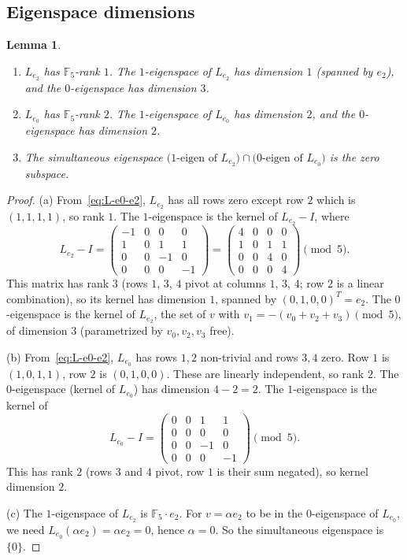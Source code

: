 \documentclass[11pt,reqno]{amsart}
\theoremstyle{plain}
\newtheorem{lemma}[theorem]{Lemma}
\theoremstyle{definition}
\theoremstyle{remark}
\newcommand{\F}{\mathbb{F}}
\begin{document}
\subsection{Eigenspace dimensions}

\begin{lemma} \label{lem:eigenspaces}
\begin{enumerate}[label=\textup{(\alph*)}]
\item $L_{e_2}$ has $\F_5$-rank $1$. The $1$-eigenspace of $L_{e_2}$ has dimension $1$ (spanned by $e_2$), and the $0$-eigenspace has dimension $3$.
\item $L_{e_0}$ has $\F_5$-rank $2$. The $1$-eigenspace of $L_{e_0}$ has dimension $2$, and the $0$-eigenspace has dimension $2$.
\item The simultaneous eigenspace $\bigl(\text{1-eigen of } L_{e_2}\bigr) \cap \bigl(\text{0-eigen of } L_{e_0}\bigr)$ is the zero subspace.
\end{enumerate}
\end{lemma}

\begin{proof}
(a) From~\eqref{eq:L-e0-e2}, $L_{e_2}$ has all rows zero except row $2$ which is $(1, 1, 1, 1)$, so rank $1$. The $1$-eigenspace is the kernel of $L_{e_2} - I$, where
\[
L_{e_2} - I = \begin{pmatrix}
-1 & 0 & 0 & 0 \\
1 & 0 & 1 & 1 \\
0 & 0 & -1 & 0 \\
0 & 0 & 0 & -1
\end{pmatrix} = \begin{pmatrix}
4 & 0 & 0 & 0 \\
1 & 0 & 1 & 1 \\
0 & 0 & 4 & 0 \\
0 & 0 & 0 & 4
\end{pmatrix} \pmod 5.
\]
This matrix has rank $3$ (rows $1$, $3$, $4$ pivot at columns $1$, $3$, $4$; row $2$ is a linear combination), so its kernel has dimension $1$, spanned by $(0, 1, 0, 0)^T = e_2$. The $0$-eigenspace is the kernel of $L_{e_2}$, the set of $v$ with $v_1 = -(v_0 + v_2 + v_3) \pmod 5$, of dimension $3$ (parametrized by $v_0, v_2, v_3$ free).

(b) From~\eqref{eq:L-e0-e2}, $L_{e_0}$ has rows $1, 2$ non-trivial and rows $3, 4$ zero. Row $1$ is $(1, 0, 1, 1)$, row $2$ is $(0, 1, 0, 0)$. These are linearly independent, so rank $2$. The $0$-eigenspace (kernel of $L_{e_0}$) has dimension $4 - 2 = 2$. The $1$-eigenspace is the kernel of
\[
L_{e_0} - I = \begin{pmatrix}
0 & 0 & 1 & 1 \\
0 & 0 & 0 & 0 \\
0 & 0 & -1 & 0 \\
0 & 0 & 0 & -1
\end{pmatrix} \pmod 5.
\]
This has rank $2$ (rows $3$ and $4$ pivot, row $1$ is their sum negated), so kernel dimension $2$.

(c) The $1$-eigenspace of $L_{e_2}$ is $\F_5 \cdot e_2$. For $v = \alpha e_2$ to be in the $0$-eigenspace of $L_{e_0}$, we need $L_{e_0}(\alpha e_2) = \alpha e_2 = 0$, hence $\alpha = 0$. So the simultaneous eigenspace is $\{0\}$.
\end{proof}
\end{document}
